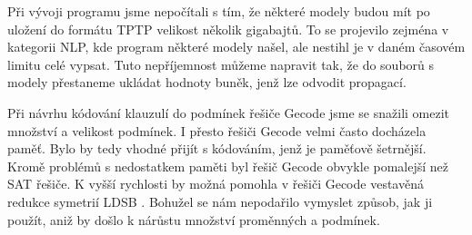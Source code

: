 %
%
%
%
%

Při vývoji programu \crossbow{} jsme nepočítali s tím,
že některé modely budou mít po uložení do formátu TPTP
velikost několik gigabajtů. To se projevilo zejména v kategorii
NLP, kde program \crossbow{} některé modely našel,
ale nestihl je v daném časovém limitu celé vypsat.
Tuto nepříjemnost můžeme napravit tak, že do
souborů s modely přestaneme ukládat hodnoty buněk,
jenž lze odvodit propagací.


Při návrhu kódování klauzulí do podmínek řešiče Gecode
jsme se snažili omezit množství a velikost
podmínek. I přesto řešiči Gecode velmi často docházela paměť.
Bylo by tedy vhodné přijít s kódováním,
jenž je paměťově šetrnější.
Kromě problémů s nedostatkem paměti byl
řešič Gecode obvykle pomalejší než SAT řešiče.
K vyšší rychlosti by možná pomohla
v řešiči Gecode vestavěná redukce symetrií LDSB \cite{ldsb}.
Bohužel se nám nepodařilo vymyslet způsob,
jak ji použít, aniž by došlo k nárůstu
množství proměnných a podmínek.

